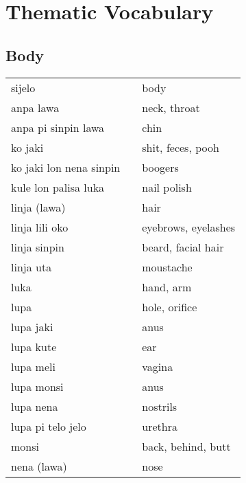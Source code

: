 
\section{Thematic Vocabulary}
\label{'thematic_vocabulary'}

\subsection{Body}

\begin{supertabular}{p{4,5cm}|ll}
    sijelo                    &  & body                    \\
    anpa lawa                 &  & neck, throat            \\
    anpa pi sinpin lawa       &  & chin                    \\
    ko jaki                   &  & shit, feces, pooh       \\
    ko jaki lon nena sinpin   &  & boogers                 \\
    kule lon palisa luka      &  & nail polish             \\
    linja (lawa)              &  & hair                    \\
    linja lili oko            &  & eyebrows, eyelashes     \\
    linja sinpin              &  & beard, facial hair      \\
    linja uta                 &  & moustache               \\
    luka                      &  & hand, arm               \\
    lupa                      &  & hole, orifice           \\
    lupa jaki                 &  & anus                    \\
    lupa kute                 &  & ear                     \\
    lupa meli                 &  & vagina                  \\
    lupa monsi                &  & anus                    \\
    lupa nena                 &  & nostrils                \\
    lupa pi telo jelo         &  & urethra                 \\
    monsi                     &  & back, behind, butt      \\
    nena (lawa)               &  & nose                    \\

\end{supertabular}

